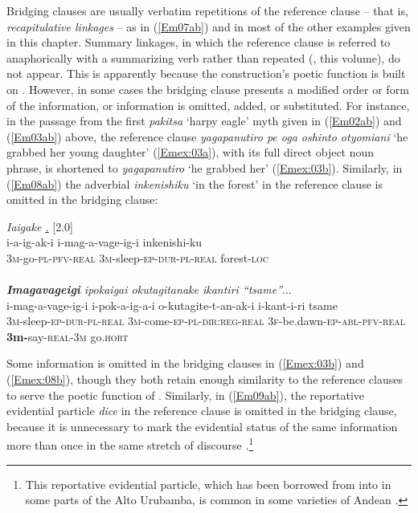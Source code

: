 \documentclass[output=paper]{LSP/langsci}
\begin{document}
 
Bridging clauses are usually verbatim repetitions of the reference clause – that is, \textit{recapitulative linkages} – as in (\ref{Em07ab}) and in most of the other examples given in this chapter. Summary linkages, in which the reference clause is referred to anaphorically with a summarizing verb rather than repeated (\citeauthor{guerin18}, this volume), do not appear. This is apparently because the construction’s poetic function is built on . However, in some cases the bridging clause presents a modified order or form of the information, or information is omitted, added, or substituted. For instance, in the passage from the first \textit{pakitsa} `harpy eagle' myth given in (\ref{Em02ab}) and (\ref{Em03ab}) above, the reference clause \textit{yagapanutiro pe oga oshinto otyomiani} `he grabbed her young daughter' (\ref{Emex:03a}), with its full direct object noun phrase, is shortened to \textit{yagapanutiro} `he grabbed her' (\ref{Emex:03b}). Similarly, in (\ref{Em08ab}) the adverbial \textit{inkenishiku} `in the forest' in the reference clause is omitted in the bridging clause:

\begin{exe}
\ex \label{Em08ab}
\begin{xlist}
\ex \label{Emex:08a}
\glt \textit{Iaigake \underline{.}} [2.0]\\
\gll i-a-ig-ak-i i-mag-a-vage-ig-i inkenishi-ku \\
 \textsc{3m-}go\textsc{-pl-pfv-real} \textsc{3m-}sleep\textsc{-ep-dur-pl-real} forest\textsc{-loc}\\
\glt {}\\
\ex \label{Emex:08b}
\glt \textit{\textbf{Imagavageigi} ipokaigai okutagitanake ikantiri ``tsame''}...\\
\gll i-mag-a-vage-ig-i i-pok-a-ig-a-i o-kutagite-t-an-ak-i i-kant-i-ri tsame\\     	      
   \textsc{3m-}sleep\textsc{-ep-dur-pl-real} \textsc{3m-}come\textsc{-ep-pl-dir:reg-real} \textsc{3f-}be.dawn\textsc{-ep-abl-pfv-real} \textbf{3m-}say\textsc{-real-3m} go.\textsc{hort}\\
\glt {}
\end{xlist}
\end{exe}


%
Some information is omitted in the bridging clauses in (\ref{Emex:03b}) and (\ref{Emex:08b}), though they both retain enough similarity to the reference clauses to serve the poetic function of . Similarly, in (\ref{Em09ab}), the  reportative evidential particle \textit{dice} in the reference clause is omitted in the bridging clause, because it is unnecessary to mark the evidential status of the same information more than once in the same stretch of discourse \citep[for a similar case in , see][392]{schulze73}.\footnote{This reportative evidential particle, which has been borrowed from  into  in some parts of the {Alto Urubamba}, is common in some varieties of Andean  \citep[as well as its variant \textit{dizque}; see][]{babel.2009}.} 
\end{document}
